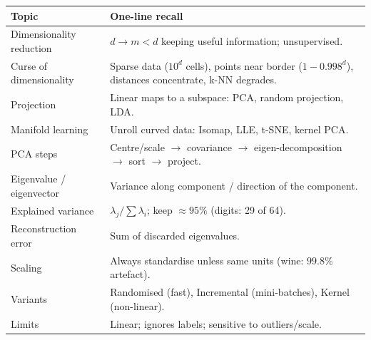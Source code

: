 \begin{revision}
\begin{center}\small
\begin{tabular}{@{}p{3.6cm}p{9.6cm}@{}}
\toprule
\textbf{Topic} & \textbf{One-line recall}\\
\midrule
Dimensionality reduction & $d\to m<d$ keeping useful information; unsupervised.\\
Curse of dimensionality & Sparse data ($10^d$ cells), points near border ($1-0.998^d$), distances concentrate, k-NN degrades.\\
Projection & Linear maps to a subspace: PCA, random projection, LDA.\\
Manifold learning & Unroll curved data: Isomap, LLE, t-SNE, kernel PCA.\\
PCA steps & Centre/scale $\to$ covariance $\to$ eigen-decomposition $\to$ sort $\to$ project.\\
Eigenvalue / eigenvector & Variance along component / direction of the component.\\
Explained variance & $\lambda_j/\sum\lambda_i$; keep $\approx95\%$ (digits: 29 of 64).\\
Reconstruction error & Sum of discarded eigenvalues.\\
Scaling & Always standardise unless same units (wine: $99.8\%$ artefact).\\
Variants & Randomised (fast), Incremental (mini-batches), Kernel (non-linear).\\
Limits & Linear; ignores labels; sensitive to outliers/scale.\\
\bottomrule
\end{tabular}
\end{center}
\end{revision}
